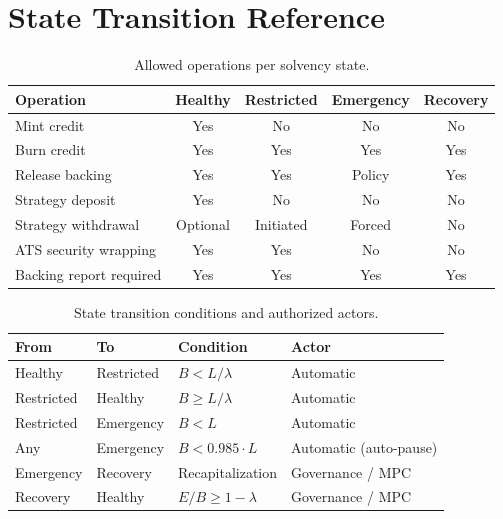 \section{State Transition Reference}

\label{sec:transitions}

\begin{table}[t]
\centering
\caption{Allowed operations per solvency state.}
\label{tab:state-ops}
\small
\begin{tabular}{@{}lcccc@{}}
\toprule
\textbf{Operation} & \textbf{Healthy} & \textbf{Restricted} & \textbf{Emergency} & \textbf{Recovery} \\
\midrule
Mint credit             & Yes      & No        & No      & No \\
Burn credit             & Yes      & Yes       & Yes     & Yes \\
Release backing         & Yes      & Yes       & Policy  & Yes \\
Strategy deposit        & Yes      & No        & No      & No \\
Strategy withdrawal     & Optional & Initiated & Forced  & No \\
ATS security wrapping   & Yes      & Yes       & No      & No \\
Backing report required & Yes      & Yes       & Yes     & Yes \\
\bottomrule
\end{tabular}
\end{table}

\begin{table}[t]
\centering
\caption{State transition conditions and authorized actors.}
\label{tab:transitions}
\small
\begin{tabular}{@{}llll@{}}
\toprule
\textbf{From} & \textbf{To} & \textbf{Condition} & \textbf{Actor} \\
\midrule
Healthy    & Restricted & $B < L / \lambda$       & Automatic \\
Restricted & Healthy    & $B \geq L / \lambda$    & Automatic \\
Restricted & Emergency  & $B < L$                  & Automatic \\
Any        & Emergency  & $B < 0.985 \cdot L$      & Automatic (auto-pause) \\
Emergency  & Recovery   & Recapitalization          & Governance / MPC \\
Recovery   & Healthy    & $E/B \geq 1 - \lambda$   & Governance / MPC \\
\bottomrule
\end{tabular}
\end{table}


